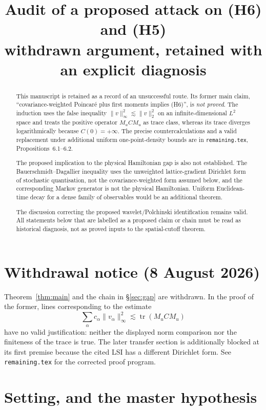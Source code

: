 \documentclass[11pt,a4paper]{article}
\title{Audit of a proposed attack on (H6) and (H5)\\
\large withdrawn argument, retained with an explicit diagnosis}
\author{}
\date{}
\theoremstyle{plain}
\theoremstyle{definition}
\DeclareMathOperator{\tr}{tr}
\begin{document}
\maketitle

\begin{abstract}
This manuscript is retained as a record of an unsuccessful route.  Its former main claim,
``covariance-weighted Poincar\'e plus first moments implies (H6)'', is \emph{not proved}.  The
induction uses the false inequality $\|v\|_\infty^2\lesssim\|v\|_2^2$ on an infinite-dimensional
$L^2$ space and treats the positive operator $M_uCM_u$ as trace class, whereas its trace diverges
logarithmically because $C(0)=+\infty$.  The precise countercalculations and a valid replacement
under additional uniform one-point-density bounds are in \texttt{remaining.tex},
Propositions~6.1--6.2.

The proposed implication to the physical Hamiltonian gap is also not established.  The
Bauerschmidt--Dagallier inequality uses the unweighted lattice-gradient Dirichlet form of
stochastic quantisation, not the covariance-weighted form assumed below, and the corresponding
Markov generator is not the physical Hamiltonian.  Uniform Euclidean-time decay for a dense
family of observables would be an additional theorem.

The discussion correcting the proposed wavelet/Polchinski identification remains valid.  All
statements below that are labelled as a proposed claim or chain must be read as historical
diagnosis, not as proved inputs to the spatial-cutoff theorem.
\end{abstract}

\section*{Withdrawal notice (8 August 2026)}

Theorem~\ref{thm:main} and the chain in \S\ref{sec:gap} are withdrawn.  In the proof of the former,
lines corresponding to the estimate
\[
 \sum_\alpha c_\alpha\|v_\alpha\|_\infty^2
 \lesssim \tr(M_uCM_u)
\]
have no valid justification: neither the displayed norm comparison nor the finiteness of the
trace is true.  The later transfer section is additionally blocked at its first premise because
the cited LSI has a different Dirichlet form.  See \texttt{remaining.tex} for the corrected proof
program.

\section{Setting, and the master hypothesis}
\end{document}
